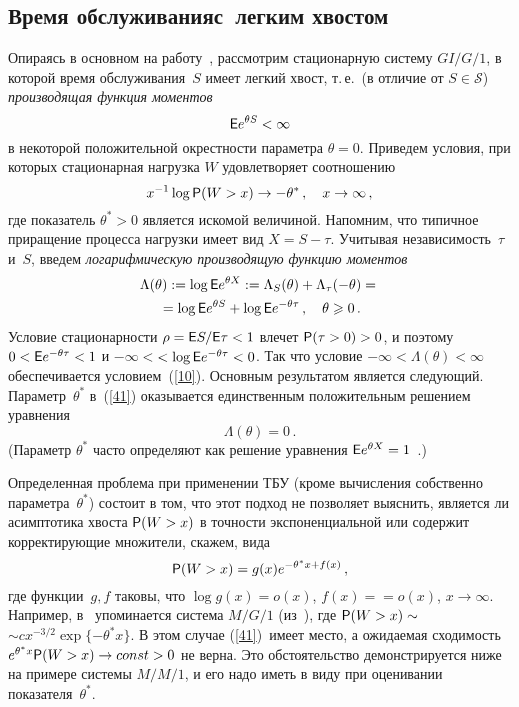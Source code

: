\begin{multicols}{2}
\section{Время обслуживания\newline с~легким хвостом}

Опираясь в основном на работу~\cite {GW}, рас\-смот\-рим стационарную
систему $GI/G/1$, в которой время обслуживания~$S$ имеет легкий
хвост, т.\,е.\ (в отличие от $S\in\mathcal{S} $) {\it производящая
функция моментов}
\begin{equation}
 {\sf E} e^ {\theta S}<\infty
\label{10}
\end{equation}
в некоторой положительной окрестности пара\-мет\-ра $\theta =0$. Приведем
условия, при которых стационарная нагрузка $W$ удовлетворяет соотношению
\begin{equation}
x^{-1}\log {\sf P} (W>x)\to -\theta^*\,, \quad x\to \infty\,,
\label{41}
\end{equation}
где показатель $\theta^*>0$ является искомой величиной. Напомним,
что типичное приращение процесса нагрузки имеет вид $X=S - \tau$.
 Учитывая независимость~$\tau$ и~$S$, введем {\it логарифмическую производящую функцию моментов}
\begin{multline*}
\Lambda(\theta):=\log {\sf E} e^{\theta X}:=\Lambda_S(\theta)+\Lambda_\tau(-\theta)={}\\
{}= \log {\sf E} e^{\theta S}+\log {\sf E} e^{-\theta \tau}\,, \quad
\theta\geqslant 0\,.
\end{multline*}
 Условие стационарности $\rho={\sf E} S/{\sf E}\tau<1$ влечет ${\sf P}(\tau>0)>0$, и поэтому
 $0<{\sf E} e^{-\theta \tau}< 1$ и $-\infty<$\linebreak $<\log{\sf E} e^{-\theta \tau}<0$. Так что
условие $-\infty<\Lambda(\theta)<\infty$ обеспечивается условием~(\ref{10}).
 Основным результатом является следующий. Параметр~$\theta^*$ в~(\ref{41}) оказывается единственным
положительным решением уравнения
\begin{equation*}
\Lambda(\theta)=0\,.
\end{equation*}
(Параметр $\theta^*$ часто определяют как решение уравнения
${\sf E} e^{\theta X}=1$~\cite {GW}.)

Определенная проблема при применении ТБУ (кроме вычисления
собственно параметра~$\theta^*$) состоит в том, что этот подход не
позволяет выяснить, является ли асимптотика хвоста ${\sf P}(W>x)$ в
точности экспоненциальной или содержит корректирующие множители, скажем, вида
\begin{equation*}
{\sf P}(W>x)=g(x)e^{-\theta^*x+f(x)}\,,
\end{equation*}
где функции~$g,f$ таковы, что $\log g(x)=o(x)$, $f(x)=$\linebreak $=o(x)$,
$x\to \infty$. Например, в~\cite {GW} упоминается
 система $M/G/1$ (из~\cite {Abate1}), где ${\sf P}(W>x)\sim $\linebreak $\sim cx^{-3/2}\exp\{-\theta^* x\}$.
 В этом случае (\ref{41})~имеет место, а ожидаемая сходимость $e^{ \theta^*x} {\sf P} (W>x)\to const>0$
 не верна. Это обстоятельство демонстрируется ниже на примере системы $M/M/1$, и его надо иметь в
виду при оценивании показателя~$\theta^*$.


\end{multicols}
